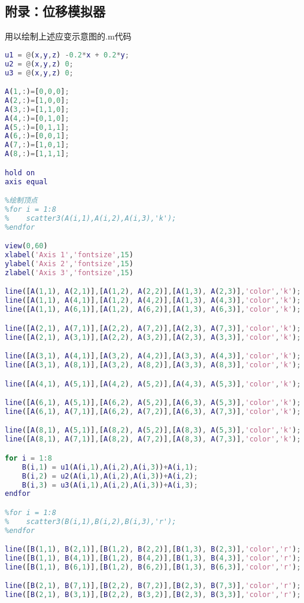 \subsection{附录：位移模拟器}
用以绘制上述应变示意图的.m代码
\begin{lstlisting}[language=matlab]
%定义位移函数，你可以设置自己的线性位移函数
u1 = @(x,y,z) -0.2*x + 0.2*y;
u2 = @(x,y,z) 0;
u3 = @(x,y,z) 0;

A(1,:)=[0,0,0];
A(2,:)=[1,0,0];
A(3,:)=[1,1,0];
A(4,:)=[0,1,0];
A(5,:)=[0,1,1];
A(6,:)=[0,0,1];
A(7,:)=[1,0,1];
A(8,:)=[1,1,1];

hold on
axis equal

%绘制顶点
%for i = 1:8
%    scatter3(A(i,1),A(i,2),A(i,3),'k');
%endfor

view(0,60)
xlabel('Axis 1','fontsize',15)
ylabel('Axis 2','fontsize',15)
zlabel('Axis 3','fontsize',15)

line([A(1,1), A(2,1)],[A(1,2), A(2,2)],[A(1,3), A(2,3)],'color','k');
line([A(1,1), A(4,1)],[A(1,2), A(4,2)],[A(1,3), A(4,3)],'color','k');
line([A(1,1), A(6,1)],[A(1,2), A(6,2)],[A(1,3), A(6,3)],'color','k');

line([A(2,1), A(7,1)],[A(2,2), A(7,2)],[A(2,3), A(7,3)],'color','k');
line([A(2,1), A(3,1)],[A(2,2), A(3,2)],[A(2,3), A(3,3)],'color','k');

line([A(3,1), A(4,1)],[A(3,2), A(4,2)],[A(3,3), A(4,3)],'color','k');
line([A(3,1), A(8,1)],[A(3,2), A(8,2)],[A(3,3), A(8,3)],'color','k');

line([A(4,1), A(5,1)],[A(4,2), A(5,2)],[A(4,3), A(5,3)],'color','k');

line([A(6,1), A(5,1)],[A(6,2), A(5,2)],[A(6,3), A(5,3)],'color','k');
line([A(6,1), A(7,1)],[A(6,2), A(7,2)],[A(6,3), A(7,3)],'color','k');

line([A(8,1), A(5,1)],[A(8,2), A(5,2)],[A(8,3), A(5,3)],'color','k');
line([A(8,1), A(7,1)],[A(8,2), A(7,2)],[A(8,3), A(7,3)],'color','k');

for i = 1:8
    B(i,1) = u1(A(i,1),A(i,2),A(i,3))+A(i,1);
    B(i,2) = u2(A(i,1),A(i,2),A(i,3))+A(i,2);
    B(i,3) = u3(A(i,1),A(i,2),A(i,3))+A(i,3);
endfor

%for i = 1:8
%    scatter3(B(i,1),B(i,2),B(i,3),'r');
%endfor

line([B(1,1), B(2,1)],[B(1,2), B(2,2)],[B(1,3), B(2,3)],'color','r');
line([B(1,1), B(4,1)],[B(1,2), B(4,2)],[B(1,3), B(4,3)],'color','r');
line([B(1,1), B(6,1)],[B(1,2), B(6,2)],[B(1,3), B(6,3)],'color','r');

line([B(2,1), B(7,1)],[B(2,2), B(7,2)],[B(2,3), B(7,3)],'color','r');
line([B(2,1), B(3,1)],[B(2,2), B(3,2)],[B(2,3), B(3,3)],'color','r');


\end{lstlisting}
